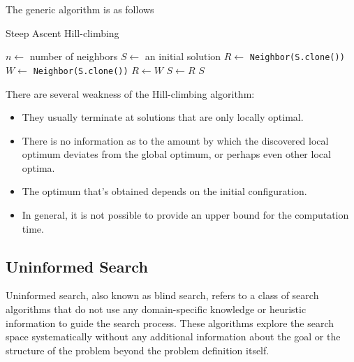                 The generic algorithm is as follows

                \begin{algorithm}[!htp]
                    \centering
                    \caption{Steep Ascent Hill-climbing}
                    \begin{algorithmic}[1]
                        \State $n \gets$ number of neighbors
                        \State $S \gets$ an initial solution
                            \State $R \gets$ \texttt{Neighbor(S.clone())}
                                \State $W \gets$ \texttt{Neighbor(S.clone())}
                                    \State $R \gets W$
                                \EndIf
                            \EndFor
                                \State $S \gets R$
                            \EndIf
                        \EndWhile
                        \State \Return $S$
                    \end{algorithmic}
                \end{algorithm}

                There are several weakness of the Hill-climbing algorithm:

                \begin{itemize}
                    \item They usually terminate at solutions that are only locally optimal.
                    \item There is no information as to the amount by which the discovered local optimum deviates from the global optimum, or perhaps even other local optima.
                    \item The optimum that's obtained depends on the initial configuration.
                    \item In general, it is not possible to provide an upper bound for the computation time.
                \end{itemize}

            \subsection{Uninformed Search}
                Uninformed search, also known as blind search, refers to a class of search algorithms that do not use any domain-specific knowledge or heuristic information to guide the search process. These algorithms explore the search space systematically without any additional information about the goal or the structure of the problem beyond the problem definition itself.

